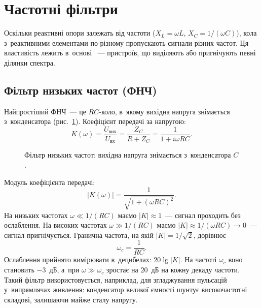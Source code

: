 \section{Частотні фільтри}\label{sec:filters}\hypertarget{frequency-filters}{}

Оскільки реактивні опори залежать від частоти ($X_L = \omega L$, $X_C = 1/(\omega C)$), кола з~реактивними елементами по-різному пропускають сигнали різних частот. Ця властивість лежить в~основі ~--- пристроїв, що виділяють або пригнічують певні ділянки спектра.

\subsection*{Фільтр низьких частот (ФНЧ)}

Найпростіший ФНЧ~--- це $RC$-коло, в~якому вихідна напруга знімається з~конденсатора (рис.~\ref{tikz:lowpass}). Коефіцієнт передачі за напругою:
\begin{equation*}
	K(\omega) = \frac{U_{\text{вих}}}{U_{\text{вх}}}
	          = \frac{Z_C}{R + Z_C}
	          = \frac{1}{1 + i\omega RC}.
\end{equation*}

\begin{figure}
	\centering
	\caption{Фільтр низьких частот: вихідна напруга знімається з~конденсатора $C$.}
	\label{tikz:lowpass}
\end{figure}

Модуль коефіцієнта передачі:
\begin{equation*}
	|K(\omega)| = \frac{1}{\sqrt{1 + (\omega RC)^2}}.
\end{equation*}
На низьких частотах $\omega \ll 1/(RC)$ маємо $|K| \approx 1$~--- сигнал проходить без ослаблення. На високих частотах $\omega \gg 1/(RC)$ маємо $|K| \approx 1/(\omega RC) \to 0$~--- сигнал пригнічується. Гранична частота, на якій $|K| = 1/\sqrt{2}$, дорівнює
\begin{equation*}
	\omega_c = \frac{1}{RC}.
\end{equation*}
Ослаблення прийнято вимірювати в~децибелах: $20\lg|K|$. На частоті $\omega_c$ воно становить $-3$~дБ, а~при $\omega \gg \omega_c$ зростає на $20$~дБ на кожну декаду частоти.
Такий фільтр використовується, наприклад, для згладжування пульсацій у~випрямлячах живлення: конденсатор великої ємності шунтує високочастотні складові, залишаючи майже сталу напругу.

